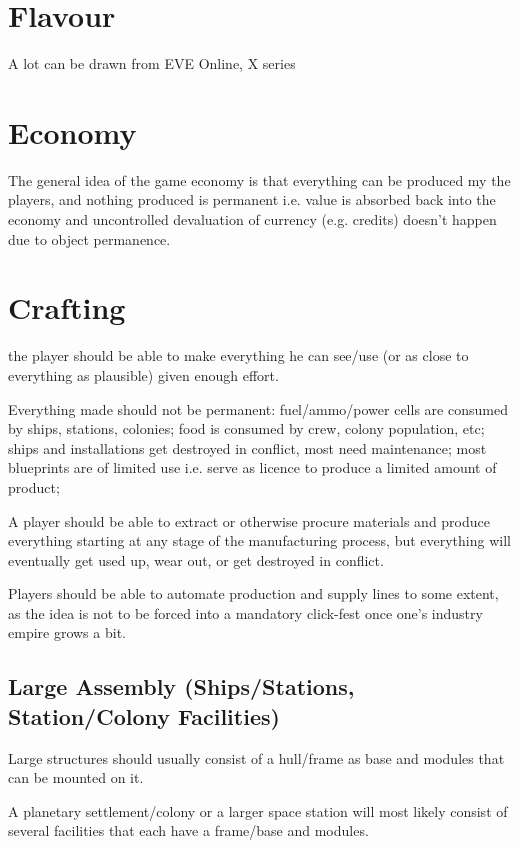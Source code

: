 \documentclass[a4paper,10pt]{article}
\begin{document}
\section{Flavour}
\begin{multicols}{2}
A lot can be drawn from EVE Online, X series

\end{multicols}

\section{Economy}
\begin{multicols}{2}
The general idea of the game economy is that everything can be produced my the
players, and nothing produced is permanent i.e. value is absorbed back into the
economy and uncontrolled devaluation of currency (e.g. credits) doesn't happen
due to object permanence.
\end{multicols}

\section{Crafting}
\begin{multicols}{2}
the player should be able to make everything he can see/use (or as close to
everything as plausible) given enough effort.

Everything made should not be permanent: fuel/ammo/power cells are consumed by
ships, stations, colonies; food is consumed by crew, colony population, etc;
ships and installations get destroyed in conflict, most need maintenance; most
blueprints are of limited use i.e. serve as licence to produce a limited amount
of product;

A player should be able to extract or otherwise procure materials and produce
everything starting at any stage of the manufacturing process, but everything
will eventually get used up, wear out, or get destroyed in conflict.

Players should be able to automate production and supply lines to some extent,
as the idea is not to be forced into a mandatory click-fest once one's industry
empire grows a bit.

\subsection{Large Assembly (Ships/Stations, Station/Colony Facilities)}
Large structures should usually consist of a hull/frame as base and modules
that can be mounted on it.

A planetary settlement/colony or a larger space station will most likely consist
of several facilities that each have a frame/base and modules.
\end{multicols}
\end{document}
